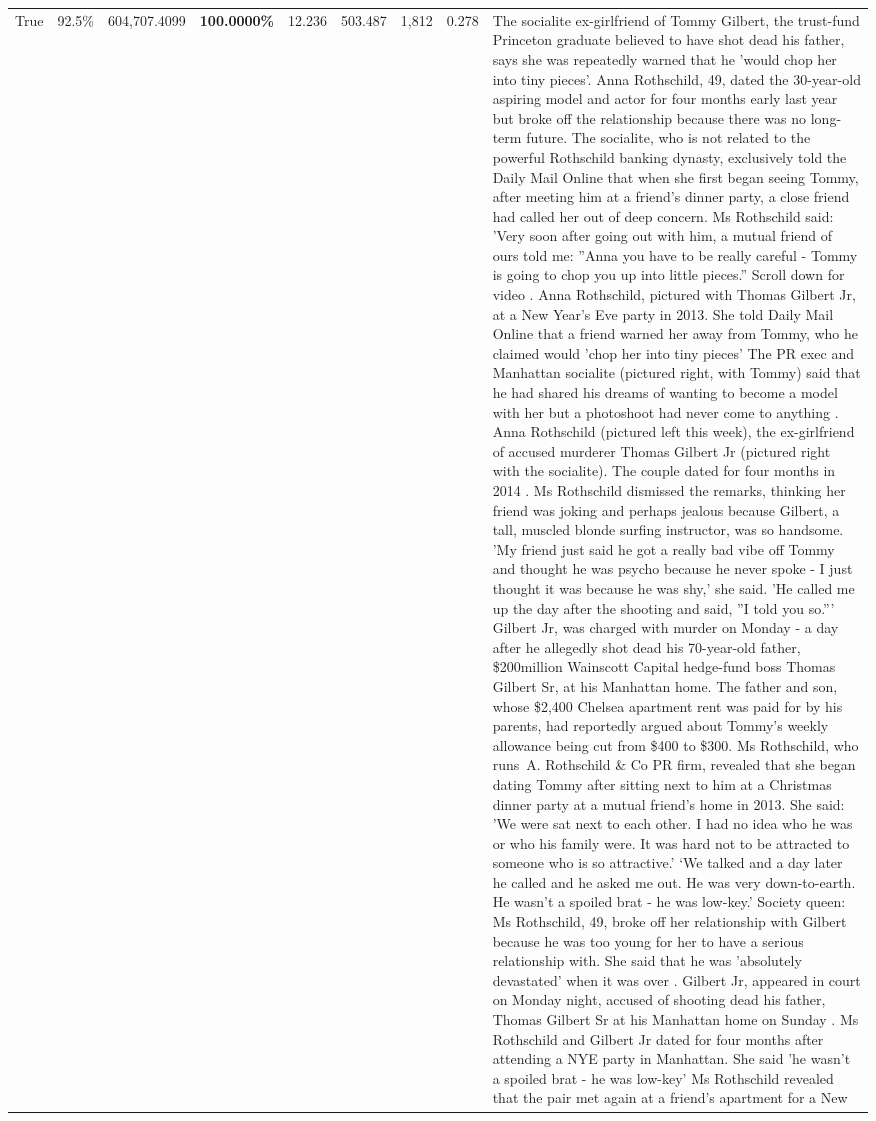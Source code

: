 \begin{table}[H]
\begin{tabular}{lllrlllll}
True & 92.5\% & 604,707.4099 & \bfseries \color{red} 100.0000\% & 12.236 & 503.487 & 1,812 & 0.278 & The socialite ex-girlfriend of Tommy Gilbert, the trust-fund Princeton graduate believed to have shot dead his father, says she was repeatedly warned that he 'would chop her into tiny pieces'. Anna Rothschild, 49, dated the 30-year-old aspiring model and actor for four months early last year but broke off the relationship because there was no long-term future. The socialite, who is not related to the powerful Rothschild banking dynasty, exclusively told the Daily Mail Online that when she first began seeing Tommy, after meeting him at a friend's dinner party, a close friend had called her out of deep concern. Ms Rothschild said: 'Very soon after going out with him, a mutual friend of ours told me: ''Anna you have to be really careful - Tommy is going to chop you up into little pieces.'' Scroll down for video . Anna Rothschild, pictured with Thomas Gilbert Jr, at a New Year's Eve party in 2013. She told Daily Mail Online that a friend warned her away from Tommy, who he claimed would 'chop her into tiny pieces' The PR exec and Manhattan socialite (pictured right, with Tommy) said that he had shared his dreams of wanting to become a model with her but a photoshoot had never come to anything . Anna Rothschild (pictured left this week), the ex-girlfriend of accused murderer Thomas Gilbert Jr (pictured right with the socialite). The couple dated for four months in 2014 . Ms Rothschild dismissed the remarks, thinking her friend was joking and perhaps jealous because Gilbert, a tall, muscled blonde surfing instructor, was so handsome. 'My friend just said he got a really bad vibe off Tommy and thought he was psycho because he never spoke - I just thought it was because he was shy,' she said. 'He called me up the day after the shooting and said, ''I told you so.''' Gilbert Jr, was charged with murder on Monday - a day after he allegedly shot dead his 70-year-old father, \$200million Wainscott Capital hedge-fund boss Thomas Gilbert Sr, at his Manhattan home. The father and son, whose \$2,400 Chelsea apartment rent was paid for by his parents, had reportedly argued about Tommy's weekly allowance being cut from \$400 to \$300. Ms Rothschild, who runs A. Rothschild \& Co PR firm, revealed that she began dating Tommy after sitting next to him at a Christmas dinner party at a mutual friend's home in 2013. She said: 'We were sat next to each other. I had no idea who he was or who his family were. It was hard not to be attracted to someone who is so attractive.' ‘We talked and a day later he called and he asked me out. He was very down-to-earth. He wasn’t a spoiled brat - he was low-key.’ Society queen: Ms Rothschild, 49, broke off her relationship with Gilbert because he was too young for her to have a serious relationship with. She said that he was 'absolutely devastated' when it was over . Gilbert Jr, appeared in court on Monday night, accused of shooting dead his father, Thomas Gilbert Sr at his Manhattan home on Sunday . Ms Rothschild and Gilbert Jr dated for four months after attending a NYE party in Manhattan. She said 'he wasn't a spoiled brat - he was low-key' Ms Rothschild revealed that the pair met again at a friend’s apartment for a New 
\end{tabular}
\end{table}

